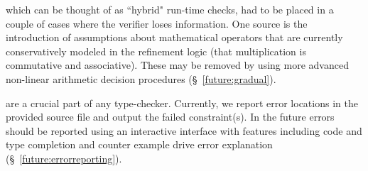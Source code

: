 which can be thought of as ``hybrid" run-time checks,
had to be placed in a couple of cases where the verifier 
loses information. 
%
One source is the introduction of assumptions about
mathematical operators that are currently conservatively 
modeled in the refinement logic (\eg that multiplication 
is commutative and associative). 
These may be removed by using more advanced non-linear 
arithmetic decision procedures (\S~\ref{future:gradual}).

 are a crucial part of any type-checker.
Currently, we report error locations in the provided source
file and output the failed constraint(s). 
% 
In the future errors should be reported using an
interactive interface with features including 
code and type completion and counter example drive
error explanation (\S~\ref{future:errorreporting}). 





